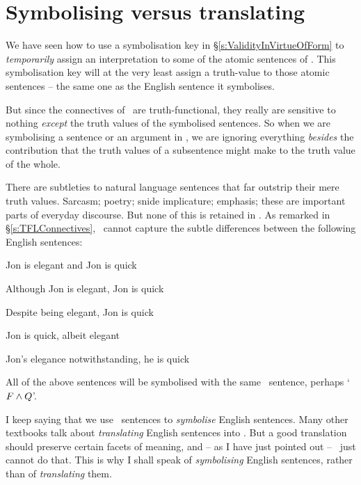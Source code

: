 \section{Symbolising versus translating} \label{sec:symvstrans}


We have seen how to use a symbolisation key in §\ref{s:ValidityInVirtueOfForm} to \emph{temporarily} assign an interpretation to some of the atomic sentences of \TFL. This symbolisation key will at the very least assign a truth-value to those atomic sentences – the same one as the English sentence it symbolises.


But since the connectives of \TFL\ are truth-functional, they really are sensitive to nothing \emph{except} the truth values of the symbolised sentences. So when we are symbolising a sentence or an argument in \TFL, we  are ignoring everything \emph{besides} the contribution that the truth values of a subsentence might make to the truth value of the whole. 

There are subtleties to natural language sentences that far outstrip their mere truth values. Sarcasm; poetry; snide implicature; emphasis; these are important parts of everyday discourse. But none of this is retained in \TFL. As remarked in §\ref{s:TFLConnectives}, \TFL\ cannot capture the subtle differences between the following English sentences:
	\begin{earg}
		\item Jon is elegant and Jon is quick
		\item Although Jon is elegant, Jon is quick
		\item Despite being elegant, Jon is quick
		\item Jon is quick, albeit elegant
		\item Jon's elegance notwithstanding, he is quick
	\end{earg}
All of the above sentences will be symbolised with the same \TFL\ sentence, perhaps `$F \wedge Q$'.

I keep saying that we use \TFL\ sentences to \emph{symbolise} English sentences. Many other textbooks talk about \emph{translating} English sentences into \TFL. But a good translation should preserve certain facets of meaning, and – as I have just pointed out – \TFL\ just cannot do that. This is why I shall speak of \emph{symbolising} English sentences, rather than of \emph{translating} them.

